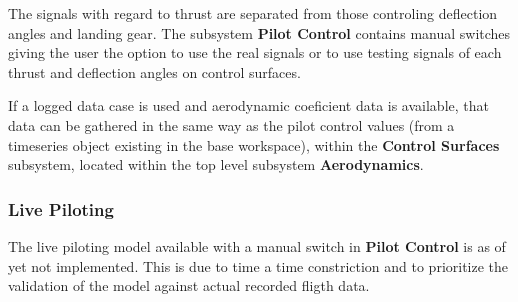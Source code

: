 The signals with regard to thrust are separated from those controling deflection angles and landing gear. The subsystem \textbf{Pilot Control} contains manual switches giving the user the option to use the real signals or to use testing signals of each thrust and deflection angles on control surfaces.

If a logged data case is used and aerodynamic coeficient data is available, that data can be gathered in the same way as the pilot control values (from a timeseries object existing in the base workspace), within the \textbf{Control Surfaces} subsystem, located within the top level subsystem \textbf{Aerodynamics}.

\subsubsection{Live Piloting}

The live piloting model available with a manual switch in \textbf{Pilot Control} is as of yet not implemented. This is due to time a time constriction and to prioritize the validation of the model against actual recorded fligth data. 
